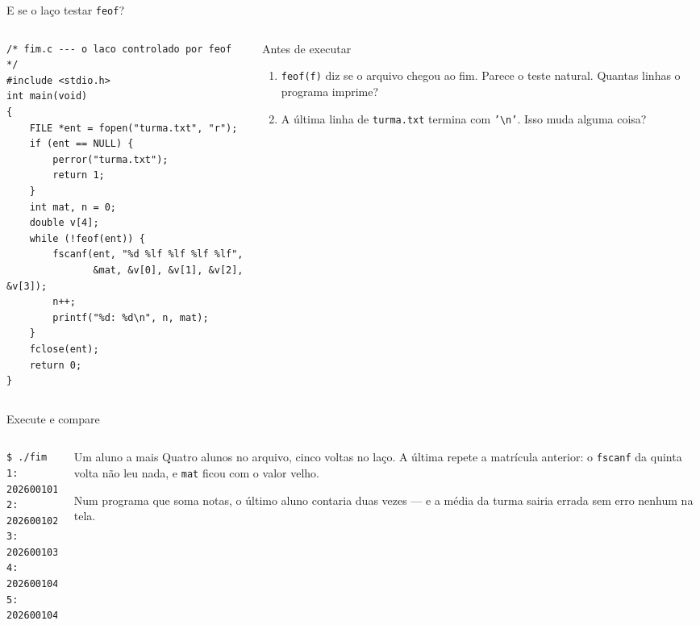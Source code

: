 \documentclass[aspectratio=169]{beamer}
\begin{document}
\begin{frame}[fragile]{E se o laço testar \texttt{feof}?}
  \vspace{-0.9em}
  \begin{columns}[T]
    \begin{column}{0.56\textwidth}
\begin{lstlisting}[style=codCs]
/* fim.c --- o laco controlado por feof */
#include <stdio.h>
int main(void)
{
    FILE *ent = fopen("turma.txt", "r");
    if (ent == NULL) {
        perror("turma.txt");
        return 1;
    }
    int mat, n = 0;
    double v[4];
    while (!feof(ent)) {
        fscanf(ent, "%d %lf %lf %lf %lf",
               &mat, &v[0], &v[1], &v[2], &v[3]);
        n++;
        printf("%d: %d\n", n, mat);
    }
    fclose(ent);
    return 0;
}
\end{lstlisting}
    \end{column}
    \begin{column}{0.40\textwidth}
      \begin{block}{Antes de executar}
        \small
        \begin{enumerate}
          \item \texttt{feof(f)} diz se o arquivo chegou ao fim. Parece o
            teste natural. Quantas linhas o programa imprime?
          \item A última linha de \texttt{turma.txt} termina com
            \texttt{'\textbackslash n'}. Isso muda alguma coisa?
        \end{enumerate}
      \end{block}
    \end{column}
  \end{columns}
\end{frame}

\begin{frame}[fragile]{Execute e compare}
  \begin{columns}[T]
    \begin{column}{0.4\textwidth}
\begin{lstlisting}[style=shellStyle]
$ ./fim
1: 202600101
2: 202600102
3: 202600103
4: 202600104
5: 202600104
\end{lstlisting}
    \end{column}
    \begin{column}{0.56\textwidth}
      \begin{block}{Um aluno a mais}
        \small Quatro alunos no arquivo, cinco voltas no laço. A última
        repete a matrícula anterior: o \texttt{fscanf} da quinta volta não
        leu nada, e \texttt{mat} ficou com o valor velho.
      \end{block}
      \small Num programa que soma notas, o último aluno contaria duas
      vezes --- e a média da turma sairia errada sem erro nenhum na tela.
    \end{column}
  \end{columns}
\end{frame}
\end{document}
